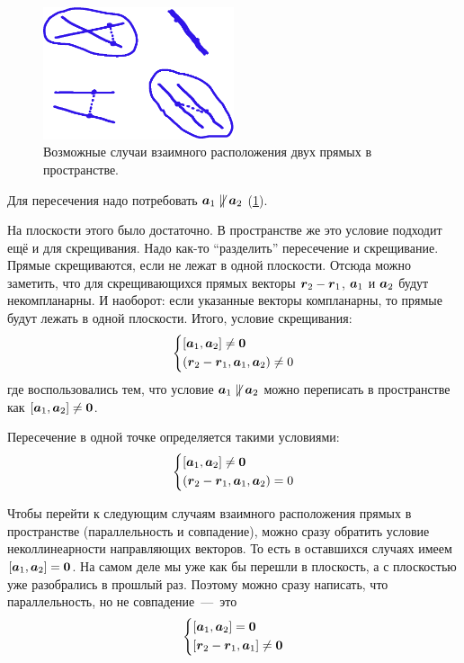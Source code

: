 \documentclass[a4paper,12pt]{article}
\begin{document}
  \begin{solution}
    \begin{figure}[h]
      \centering
      
      \includegraphics[width=0.5\textwidth]{different-cases}
      
      \caption{Возможные случаи взаимного расположения двух прямых в пространстве.}
      \label{fig:different-cases}
    \end{figure}
  
    Для пересечения надо потребовать $\boldsymbol a_1 \not\parallel \boldsymbol a_2$ (\ref{fig:different-cases}).
    
    На плоскости этого было достаточно.
    В пространстве же это условие подходит ещё и для скрещивания.
    Надо как-то ``разделить'' пересечение и скрещивание.
    Прямые скрещиваются, если не лежат в одной плоскости.
    Отсюда можно заметить, что для скрещивающихся прямых векторы $\bds r_2 \hm- \bds r_1$, $\boldsymbol a_1$ и $\boldsymbol a_2$ будут некомпланарны.
    И наоборот: если указанные векторы компланарны, то прямые будут лежать в одной плоскости.
    Итого, условие скрещивания:
    \[
      \left\{
        \begin{aligned}
          &[\boldsymbol a_1, \boldsymbol a_2] \not= \boldsymbol 0\\
          &(\boldsymbol r_2 - \boldsymbol r_1, \boldsymbol a_1, \boldsymbol a_2) \not= 0
        \end{aligned}
      \right.
    \]
    где воспользовались тем, что условие $\boldsymbol a_1 \not\parallel \boldsymbol a_2$ можно переписать в пространстве как $[\bds a_1, \bds a_2] \hm{\not=} \bds 0$.
    
    Пересечение в одной точке определяется такими условиями:
    \[
      \left\{
        \begin{aligned}
          &[\boldsymbol a_1, \boldsymbol a_2] \not= \boldsymbol 0\\
          &(\boldsymbol r_2 - \boldsymbol r_1, \boldsymbol a_1, \boldsymbol a_2) = 0
        \end{aligned}
      \right.
    \]
    
    Чтобы перейти к следующим случаям взаимного расположения прямых в пространстве (параллельность и совпадение), можно сразу обратить условие неколлинеарности направляющих векторов.
    То есть в оставшихся случаях имеем $[\bds a_1, \bds a_2] \hm= \bds 0$.
    На самом деле мы уже как бы перешли в плоскость, а с плоскостью уже разобрались в прошлый раз.
    Поэтому можно сразу написать, что параллельность, но не совпадение~---~это
    \[
      \left\{
        \begin{aligned}
          &[\boldsymbol a_1, \boldsymbol a_2] = \boldsymbol 0\\
          &[\boldsymbol r_2 - \boldsymbol r_1, \boldsymbol a_1] \not= \boldsymbol 0
        \end{aligned}
      \right.
    \]
    

\end{solution}
\end{document}
